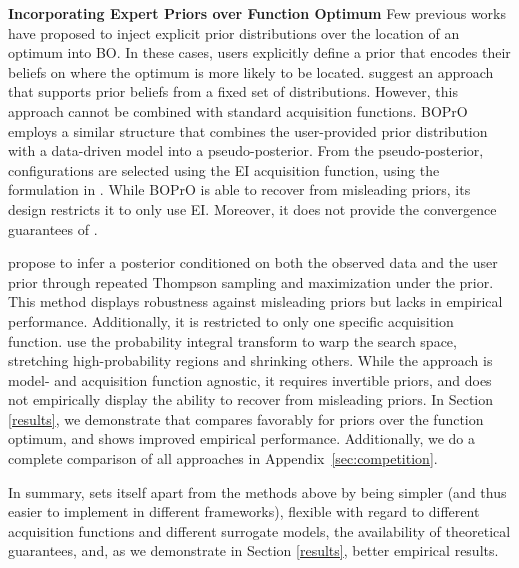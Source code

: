\documentclass{article}
\newcommand{\frank}[1]{\todo[color=yellow]{Frank: #1}} %
\newcommand{\carl}[1]{{\todo[color=purple]{Carl: #1}}}
\newcommand{\luigi}[1]{\todo[color=orange]{Luigi: #1}}
\newcommand{\method}[0]{\text{${\pi}$BO}\xspace}
\begin{document}
\textbf{Incorporating Expert Priors over Function Optimum}\quad 
Few previous works have proposed to inject explicit prior distributions over the location of an optimum into BO. In these cases, users explicitly define a prior that encodes their beliefs on where the optimum is more likely to be located. \citet{bergstra-nips11a} suggest an approach that supports prior beliefs from a fixed set of distributions. However, this approach cannot be combined with standard %
acquisition functions. BOPrO~\citep{souza2021bayesian} employs a similar structure that combines the user-provided prior distribution with a data-driven model into a pseudo-posterior. From the pseudo-posterior, configurations are selected using the EI acquisition function, using the formulation in \citet{bergstra-nips11a}. While BOPrO is able to recover from misleading priors, its design restricts it to only use EI. Moreover, it does not provide the convergence guarantees of \method{}.

\citet{Li2020IncorporatingEP} propose to infer a posterior conditioned on both the observed data and the user prior through repeated Thompson sampling and maximization under the prior. 
This method displays robustness against misleading priors but lacks in empirical performance. Additionally, it is restricted to only one specific acquisition function. 
\citet{RAMACHANDRAN2020105663} use 
the probability integral transform to warp the search space, stretching high-probability regions and shrinking others. While the approach is model- and acquisition function agnostic, it requires invertible priors, and does not empirically display the ability to recover from misleading priors. In Section \ref{results}, we demonstrate that \method{} compares favorably for priors over the function optimum, and shows improved empirical performance. Additionally, we do a complete comparison of all approaches in Appendix~\ref{sec:competition}.

In summary, \method{} sets itself apart from the methods above by being simpler (and thus easier to implement in different frameworks), flexible with regard to different acquisition functions and different surrogate models, the availability of theoretical guarantees, and, as we demonstrate in Section \ref{results}, better empirical results.
\end{document}
